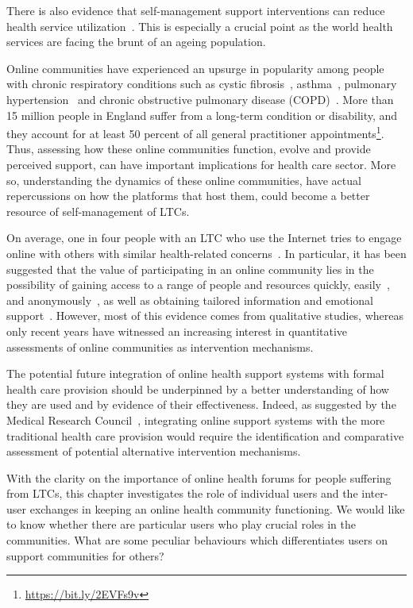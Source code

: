 There is also evidence that self-management support interventions can reduce health service utilization~\cite{panagioti2014self,taylor2014rapid}. This is especially a crucial point as the world health services are facing the brunt of an ageing population.

Online communities have experienced an upsurge in popularity among people with chronic respiratory conditions such as cystic fibrosis~\cite{kirk2016exploration}, asthma~\cite{stewart2011online}, pulmonary hypertension~\cite{matura2013virtual} and chronic obstructive pulmonary disease (COPD)~\cite{wentzer2013narratives}. More than 15 million people in England suffer from a long-term condition or disability, and they account for at least 50 percent of all general practitioner appointments\footnote{\url{https://bit.ly/2EVFs9v}}. Thus, assessing how these online communities function, evolve and provide perceived support, can have important implications for health care sector. More so, understanding the dynamics of these online communities, have actual repercussions on how the platforms that host them, could become a better resource of self-management of LTCs.

On average, one in four people with an LTC who use the Internet tries to engage online with others with similar health-related concerns~\cite{fox2011social}. In particular, it has been suggested that the value of participating in an online community lies in the possibility of gaining access to a range of people and resources quickly, easily~\cite{armstrong2000real}, and anonymously~\cite{pendry2015individual}, as well as obtaining tailored information and emotional support~\cite{ali2015online,de2017adolescents,shoebotham2016therapeutic,coulson2005receiving,de2016stroke}. However, most of this evidence comes from qualitative studies, whereas only recent years have witnessed an increasing interest in quantitative assessments of online communities as intervention mechanisms. 

The potential future integration of online health support systems with formal health care provision should be underpinned by a better understanding of how they are used and by evidence of their effectiveness. Indeed, as suggested by the Medical Research Council~\cite{Craiga1655}, integrating online support systems with the more traditional health care provision would require the identification and comparative assessment of potential alternative intervention mechanisms.



With the clarity on the importance of online health forums for people suffering from LTCs, this chapter investigates the role of individual users and the inter-user exchanges in keeping an online health community functioning. We would like to know whether there are particular users who play crucial roles in the communities. What are some peculiar behaviours which differentiates users on support communities for others?

